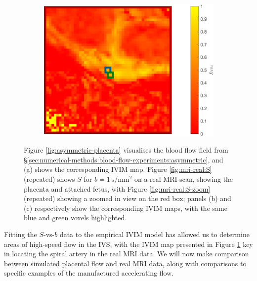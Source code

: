 \begin{figure}
\begin{centering}
\begin{subfigure}{0.5\textwidth}
\begin{centering}
                        \includegraphics[width=\textwidth]{diagrams/results-mri/fits/real-mri_ivim-zoom.png}
                        \caption{}
                        \label{fig:mri-ivim:real-zoom}
                    \end{centering}
                \end{subfigure}
            \end{centering}
            \caption{Figure \ref{fig:asymmetric-placenta} visualises the blood flow field from \S\ref{sec:numerical-methods:blood-flow-experiments:asymmetric}, and (a) shows the corresponding IVIM map. Figure \ref{fig:mri-real:S} (repeated) shows $S$ for $b=\qty{1}{\second\per\milli\metre^2}$ on a real MRI scan, showing the placenta and attached fetus, with Figure \ref{fig:mri-real:S-zoom} (repeated) showing a zoomed in view on the red box; panels (b) and (c) respectively show the corresponding IVIM maps, with the same blue and green voxels highlighted.}
            \label{fig:mri-ivim}
        \end{figure}

        Fitting the $S$-vs-$b$ data to the empirical IVIM model has allowed us to determine areas of high-speed flow in the IVS, with the IVIM map presented in Figure \ref{fig:mri-ivim:real-zoom} key in locating the spiral artery in the real MRI data. We will now make comparison between simulated placental flow and real MRI data, along with comparisons to specific examples of the manufactured accelerating flow. 

